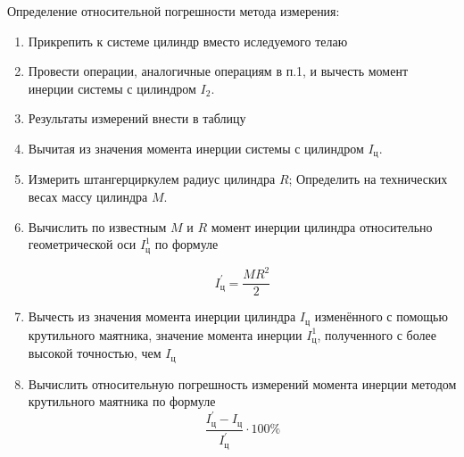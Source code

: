 \item Определение относительной погрешности метода измерения:
    \begin{enumerate}
        \item Прикрепить к системе цилиндр вместо иследуемого телаю
        \item Провести операции, аналогичные операциям в п.1, и вычесть момент инерции системы с цилиндром $I_2$.
        \item Результаты измерений внести в таблицу
        \item Вычитая из значения момента инерции системы с цилиндром $I_\text{ц}$.
        \item Измерить штангерциркулем радиус цилиндра $R$;
        Определить на технических весах массу цилиндра $M$.
        \item Вычислить по известным $M$ и $R$ момент инерции цилиндра относительно геометрической оси $I_\text{ц}^1$ по формуле
        
        \begin{equation*}
            I_\text{ц}^{'} = \frac{MR^2}{2} 
        \end{equation*}
        
        \item Вычесть из значения момента инерции цилиндра $I_\text{ц}$
        изменённого с помощью крутильного маятника, значение момента инерции $I_\text{ц}^1$,
        полученного с более высокой точностью, чем $I_\text{ц}$
        \item Вычислить относительную погрешность измерений момента инерции методом крутильного маятника по формуле
        \begin{equation*}
            \frac{I_\text{ц}^{'} - I_\text{ц}}{I_\text{ц}^{'}} \cdot 100 \% 
        \end{equation*}
    \end{enumerate}